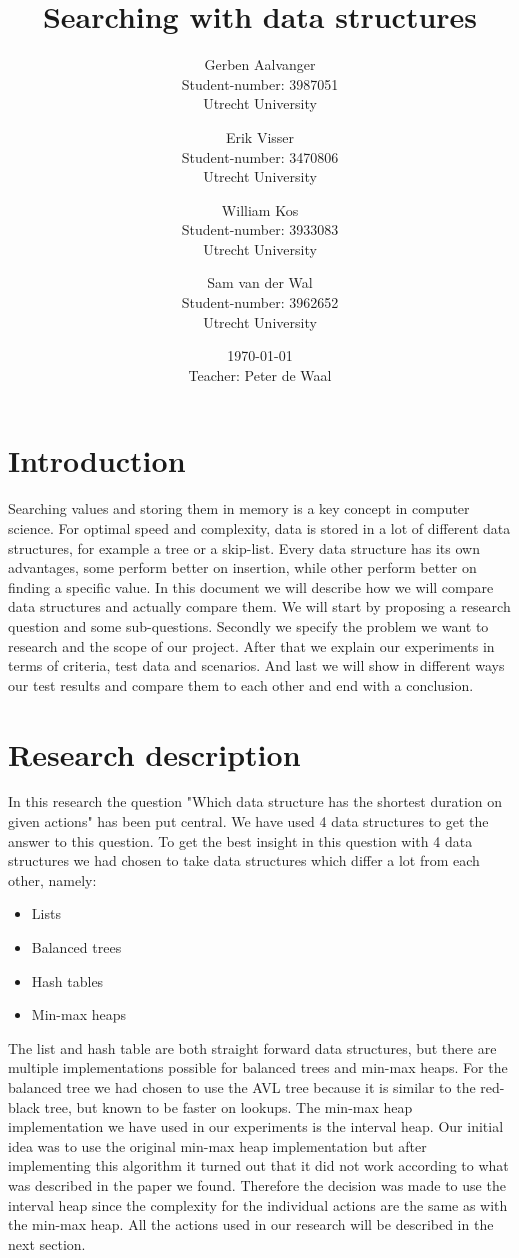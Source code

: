 \documentclass{article}
\title{Searching with data structures}
\author{
		Gerben Aalvanger\\ 
	        	Student-number: 3987051 \\
	        	Utrecht University
			\and
		Erik Visser\\
	        	Student-number: 3470806 \\
	        	Utrecht University
	        	\and
		William Kos\\
	        	Student-number: 3933083\\
	        	Utrecht University\\
	        	\and
		Sam van der Wal\\
	        	Student-number: 3962652\\
	        	Utrecht University}
\date{\today \\Teacher: Peter de Waal}
\begin{document}
\maketitle
\section{Introduction}
Searching values and storing them in memory is a key concept in computer science. For optimal speed and complexity, data is stored in a lot of different data structures, for example a tree or a skip-list. Every data structure has its own advantages, some perform better on insertion, while other perform better on finding a specific value. In this document we will describe how we will compare data structures and actually compare them. We will start by proposing a research question and some sub-questions. Secondly we specify the problem we want to research and the scope of our project. After that we explain our experiments in terms of criteria, test data and scenarios. And last we will show in different ways our test results and compare them to each other and end with a conclusion. 

\section{Research description}
In this research the question "Which data structure has the shortest duration on given actions" has been put central. We have used 4 data structures to get the answer to this question. To get the best insight in this question with 4 data structures we had chosen to take data structures which differ a lot from each other, namely:
\begin{itemize}
\item Lists
\item Balanced trees
\item Hash tables
\item Min-max heaps
\end{itemize}
The list and hash table are both straight forward data structures, but there are multiple implementations possible for balanced trees and min-max heaps. For the balanced tree we had chosen to use the AVL tree because it is similar to the red-black tree, but known to be faster on lookups. The min-max heap implementation we have used in our experiments is the interval heap. Our initial idea was to use the original min-max heap implementation but after implementing this algorithm it turned out that it did not work according to what was described in the paper we found. Therefore the decision was made to use the interval heap since the complexity for the individual actions are the same as with the min-max heap. All the actions used in our research will be described in the next section.
\end{document}
